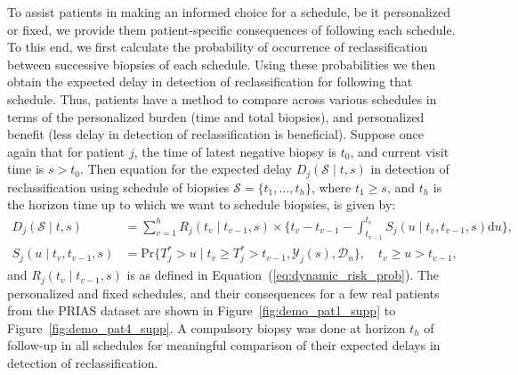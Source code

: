 To assist patients in making an informed choice for a schedule, be it personalized or fixed, we provide them patient-specific consequences of following each schedule. To this end, we first calculate the probability of occurrence of reclassification between successive biopsies of each schedule. Using these probabilities we then obtain the expected delay in detection of reclassification for following that schedule. Thus, patients have a method to compare across various schedules in terms of the personalized burden (time and total biopsies), and personalized benefit (less delay in detection of reclassification is beneficial). Suppose once again that for patient $j$, the time of latest negative biopsy is $t_0$, and current visit time is $s > t_0$. Then equation for the expected delay $D_j(\mathcal{S} \mid t,s)$ in detection of reclassification using schedule of biopsies $\mathcal{S} = \{t_1, \ldots, t_h\}$, where $t_1 \geq s$, and $t_h$ is the horizon time up to which we want to schedule biopsies, is given by:
\begin{equation}
\label{eq:expected_delay}
\begin{split}
D_j(\mathcal{S} \mid t,s) &= \sum_{v=1}^{h} R_j(t_v\mid t_{v-1},s) \times  \Big\{t_{v} - t_{v-1} - \int_{t_{v-1}}^{t_v} S_j(u \mid t_v, t_{v-1}, s) \mathrm{d}u \Big\},\\
S_j(u \mid t_v, t_{v-1}, s) &= \mbox{Pr}\big\{T^*_j > u \mid t_{v} \geq T^*_j > t_{v-1}, \mathcal{Y}_{j}(s), \mathcal{D}_n\big\}, \quad t_{v} \geq u > t_{v-1},
\end{split}
\end{equation}
and $R_j(t_v\mid t_{v-1},s)$ is as defined in Equation~(\ref{eq:dynamic_risk_prob}). The personalized and fixed schedules, and their consequences for a few real patients from the PRIAS dataset are shown in Figure~\ref{fig:demo_pat1_supp} to Figure~\ref{fig:demo_pat4_supp}. A compulsory biopsy was done at horizon $t_h$ of follow-up in all schedules for meaningful comparison of their expected delays in detection of reclassification.

